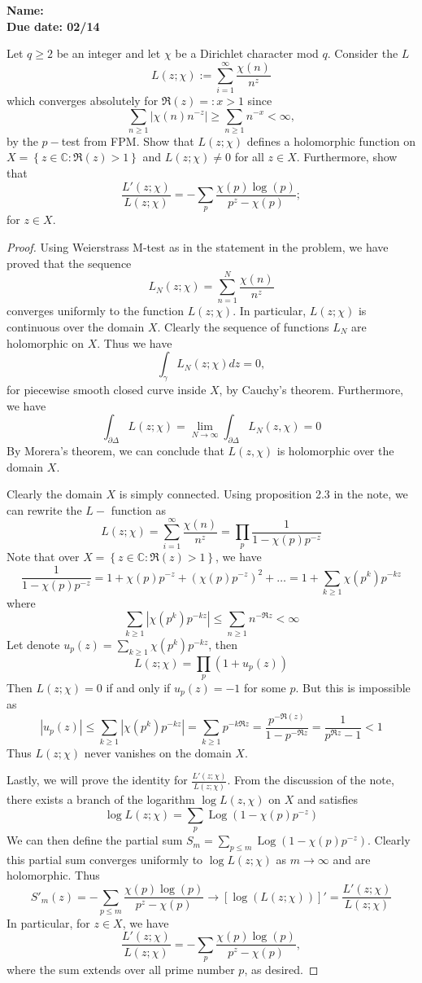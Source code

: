 \documentclass[11pt,letterpaper]{article}
\newcommand{\homework}[2]{\noindent\textbf{Name: }{} \hfill \textbf{} \\  \textbf{Due date: #2} \hfill \textbf{}\\}
\newcounter{problem}
\DeclareMathOperator{\1}{\mathbbm{1}}
\DeclareMathOperator{\Log}{Log}
\begin{document}
\homework{\#}{02/14}


\begin{exercise}
  Let $q \ge 2$ be an integer and let $\chi$ be a Dirichlet character mod $q$. Consider the $L$
  \[L(z;\chi) := \sum_{i=1}^\infty \dfrac{\chi(n)}{n^z}\]
  which converges absolutely for $\Re(z)=:x >1$ since
  \[ \sum_{n\ge 1 }|\chi(n)n^{-z}| \ge \sum_{n\ge 1} n^{-x} <\infty,\]
  by the $p-$test from FPM. Show that $L(z;\chi)$ defines a holomorphic function on $X = \left\lbrace z \in \mathbb{C}: \Re(z)>1 \right\rbrace$
  and $L(z;\chi) \ne 0$ for all $z \in X$. Furthermore, show that
  \[\dfrac{L'(z;\chi)}{L(z;\chi)} = - \sum_p \dfrac{\chi(p)\log(p)}{p^z-\chi(p)};\]
  for $z \in X$.
\end{exercise}
\begin{proof}
  \hfill
  Using Weierstrass M-test as in the statement in the problem, we have proved that the sequence
  \[ L_N(z;\chi) = \sum_{n=1}^N \dfrac{\chi(n)}{n^z}\]
  converges uniformly to the function $L(z;\chi)$. In particular, $L(z;\chi)$ is continuous
  over the domain $X$. Clearly the sequence of functions $L_N$ are holomorphic on $X$. Thus we have
  \[\int_{\gamma} L_N(z; \chi)dz = 0,\]
  for piecewise smooth closed curve inside $X$, by Cauchy's theorem. Furthermore, we have
  \[\int_{\partial \Delta} L(z;\chi) = \lim_{N \to \infty} \int_{\partial \Delta} L_N(z,\chi) =0\]
  By Morera's theorem, we can conclude that $L(z,\chi)$ is holomorphic over the domain $X$.

  Clearly the domain $X$ is simply connected. Using proposition 2.3 in the note, we can rewrite the $L-$ function as
  \[L(z;\chi ) = \sum_{i=1}^\infty \dfrac{\chi(n)}{n^z} = \prod_p \dfrac{1}{1-\chi(p)p^{-z}}\]
  Note that over $X= \left\lbrace z \in \mathbb{C}: \Re(z)>1 \right\rbrace$, we have
  \[\dfrac{1}{1-\chi(p)p^{-z}} = 1+ \chi(p)p^{-z}+ (\chi(p)p^{-z})^2+\ldots = 1+ \sum_{k\ge 1} \chi(p^k)p^{-kz}\]
  where
  \[\sum_{k\ge 1} |\chi(p^k)p^{-kz}| \le \sum_{n \ge 1} n^{-\Re z}<\infty\]
  Let denote $u_p(z)= \sum_{k\ge 1} \chi(p^k)p^{-kz}$, then
  \[L(z;\chi) = \prod_p \left(1+u_p(z)\right)\]
  Then $L(z;\chi)=0$ if and only if $u_p(z) =-1$ for some $p$. But this is impossible as
  \[|u_p(z)| \le \sum_{k\ge 1} |\chi(p^k)p^{-kz}| = \sum_{k\ge 1} p^{-k\Re z} = \dfrac{p^{-\Re (z)}}{1-p^{-\Re z}} =\dfrac{1}{p^{\Re z}-1} <1\]
  Thus $L(z;\chi)$ never vanishes on the domain $X$.

  Lastly, we will prove the identity for $\frac{L'(z;\chi)}{L(z;\chi)}$. From the discussion of the note,
  there exists a branch of the logarithm $\log L(z,\chi)$ on $X$ and satisfies
  \[\log L(z;\chi) = \sum_p \Log(1-\chi(p)p^{-z})\]
  We can then define the partial sum $S_m = \sum_{p\le m} \Log(1-\chi(p)p^{-z})$. Clearly this partial sum converges uniformly to
  $\log L(z;\chi)$ as $m \to \infty$ and are holomorphic. Thus
  \[S'_m(z) = -\sum_{p \le m} \dfrac{\chi(p)\log(p)}{p^z-\chi(p)} \to \left[\log(L(z;\chi))\right]' = \dfrac{L'(z;\chi)}{L(z;\chi)}\]
  In particular, for $z \in X$, we have
  \[\dfrac{L'(z;\chi)}{L(z;\chi)}= -\sum_{p } \dfrac{\chi(p)\log(p)}{p^z-\chi(p)},\]
  where the sum extends over all prime number $p$, as desired.
\end{proof}
\end{document}
